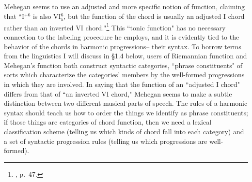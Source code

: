 Mehegan seems to use an adjusted and more specific notion of function, claiming that ``I$^{+6}$ is also VI$^{6}_5$, but the function of the chord is usually an adjusted I chord rather than an inverted VI chord."\footnote{\cite{mehegan1959}, p.\ 47.}  This ``tonic function" has no necessary connection to the labeling procedure he employs, and it is evidently tied to the behavior of the chords in harmonic progressions-- their syntax.  To borrow terms from the linguistics I will discuss in \S 1.4 below, users of Riemannian function and Mehegan's function both construct syntactic categories, ``phrase constituents" of sorts which characterize the categories' members by the well-formed progressions in which they are involved.  In saying that the function of an ``adjusted I chord" differs from that of ``an inverted VI chord," Mehegan seems to make a subtle distinction between two different musical parts of speech.  The rules of a harmonic syntax should teach us how to order the things we identify as phrase constituents; if those things are categories of chord function, then we need a lexical classification scheme (telling us which kinds of chord fall into each category) and a set of syntactic progression rules (telling us which progressions are well-formed).

